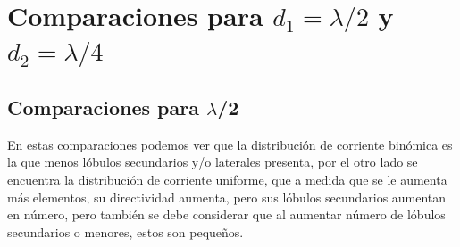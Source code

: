 \documentclass[11pt]{report}
\begin{document}
\newpage

\section{Comparaciones para $d_1 = \lambda/2$ y $d_2 = \lambda/4$}

\subsection{Comparaciones para $\lambda$/2}

En estas comparaciones podemos ver que la distribución de corriente binómica es la que menos lóbulos secundarios y/o laterales presenta, por el otro lado se encuentra la distribución de corriente uniforme, que a medida que se le aumenta más elementos, su directividad aumenta, pero sus lóbulos secundarios aumentan en número, pero también se debe considerar que al aumentar número de lóbulos secundarios o menores, estos son pequeños. 
\end{document}

